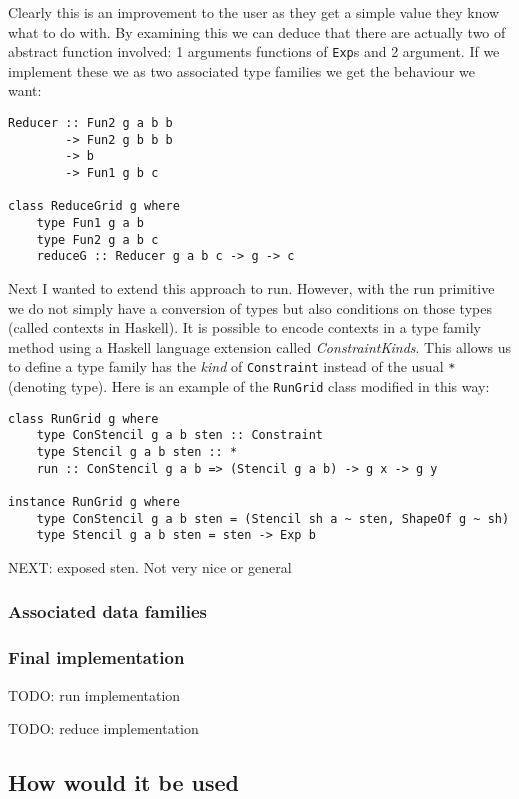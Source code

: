Clearly this is an improvement to the user as they get a simple value
they know what to do with. By examining this we can deduce that there
are actually two of abstract function involved: 1 arguments functions of
\texttt{Exp}s and 2 argument. If we implement these we as two associated
type families we get the behaviour we want:

\begin{verbatim}
Reducer :: Fun2 g a b b
        -> Fun2 g b b b
        -> b
        -> Fun1 g b c

class ReduceGrid g where
    type Fun1 g a b
    type Fun2 g a b c
    reduceG :: Reducer g a b c -> g -> c
\end{verbatim}

Next I wanted to extend this approach to run. However, with the run
primitive we do not simply have a conversion of types but also
conditions on those types (called contexts in Haskell). It is possible
to encode contexts in a type family method using a Haskell language
extension called \emph{ConstraintKinds}. This allows us to define a type
family has the \emph{kind} of \texttt{Constraint} instead of the usual
\texttt{*} (denoting type). Here is an example of the \texttt{RunGrid}
class modified in this way:

\begin{verbatim}
class RunGrid g where
    type ConStencil g a b sten :: Constraint
    type Stencil g a b sten :: *
    run :: ConStencil g a b => (Stencil g a b) -> g x -> g y

instance RunGrid g where
    type ConStencil g a b sten = (Stencil sh a ~ sten, ShapeOf g ~ sh)
    type Stencil g a b sten = sten -> Exp b
\end{verbatim}

NEXT: exposed sten. Not very nice or general

\subsubsection{Associated data families}

\subsubsection{Final implementation}

TODO: run implementation

TODO: reduce implementation

\subsection{How would it be used}

